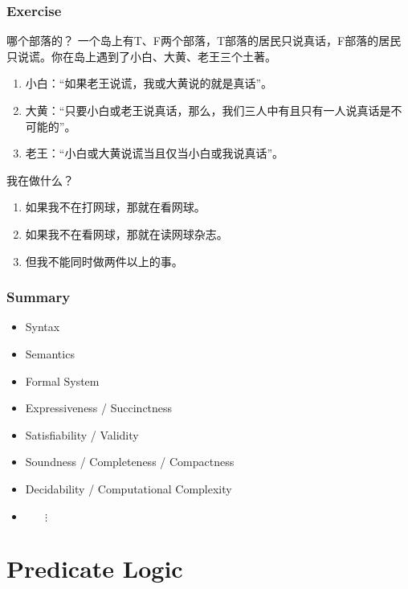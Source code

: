 \documentclass[UTF8,aspectratio=43,11pt,colorlinks,compress,openany]{beamer}%
\begin{document}
\begin{frame}\frametitle{Exercise}
		\begin{block}{哪个部落的？}
		一个岛上有T、F两个部落，T部落的居民只说真话，F部落的居民只说谎。你在岛上遇到了小白、大黄、老王三个土著。
			\begin{enumerate}
				\item 小白：“如果老王说谎，我或大黄说的就是真话”。
				\item 大黄：“只要小白或老王说真话，那么，我们三人中有且只有一人说真话是不可能的”。
				\item 老王：“小白或大黄说谎当且仅当小白或我说真话”。
			\end{enumerate}
		\end{block}
		\begin{block}{我在做什么？}
			\begin{enumerate}
				\item 如果我不在打网球，那就在看网球。
				\item 如果我不在看网球，那就在读网球杂志。
				\item 但我不能同时做两件以上的事。
			\end{enumerate}
		\end{block}
\end{frame}

\begin{frame}\frametitle{Summary}
	\begin{itemize}
		\item Syntax
		\item Semantics
		\item Formal System
	\end{itemize}
	\begin{itemize}
		\item Expressiveness / Succinctness
		\item Satisfiability / Validity
		\item Soundness / Completeness / Compactness
		\item Decidability / Computational Complexity
		\item $\phantom{Dec}\vdots$
	\end{itemize}
\end{frame}


\section{Predicate Logic}
\end{document}
